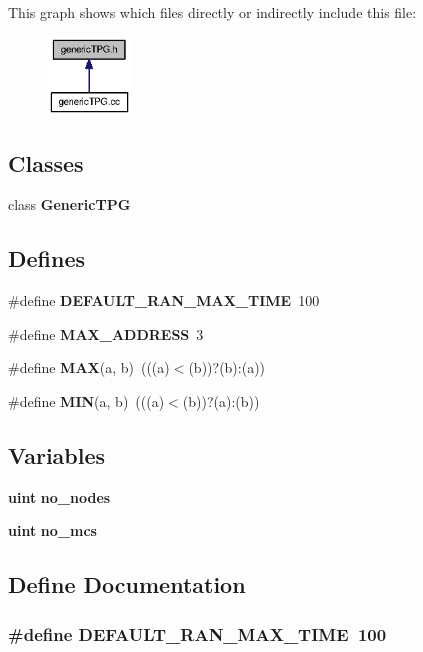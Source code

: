 This graph shows which files directly or indirectly include this file:\nopagebreak
\begin{figure}[H]
\begin{center}
\leavevmode
\includegraphics[width=62pt]{genericTPG_8h__dep__incl}
\end{center}
\end{figure}
\subsection*{Classes}
\begin{CompactItemize}
\item 
class {\bf GenericTPG}
\end{CompactItemize}
\subsection*{Defines}
\begin{CompactItemize}
\item 
\#define {\bf DEFAULT\_\-RAN\_\-MAX\_\-TIME}~100
\item 
\#define {\bf MAX\_\-ADDRESS}~3
\item 
\#define {\bf MAX}(a, b)~(((a)$<$(b))?(b):(a))
\item 
\#define {\bf MIN}(a, b)~(((a)$<$(b))?(a):(b))
\end{CompactItemize}
\subsection*{Variables}
\begin{CompactItemize}
\item 
{\bf uint} {\bf no\_\-nodes}
\item 
{\bf uint} {\bf no\_\-mcs}
\end{CompactItemize}


\subsection{Define Documentation}
\subsubsection[{DEFAULT\_\-RAN\_\-MAX\_\-TIME}]{\setlength{\rightskip}{0pt plus 5cm}\#define DEFAULT\_\-RAN\_\-MAX\_\-TIME~100}\label{genericTPG_8h_95a6218d50e244f6e58b6cca098c1d65}




